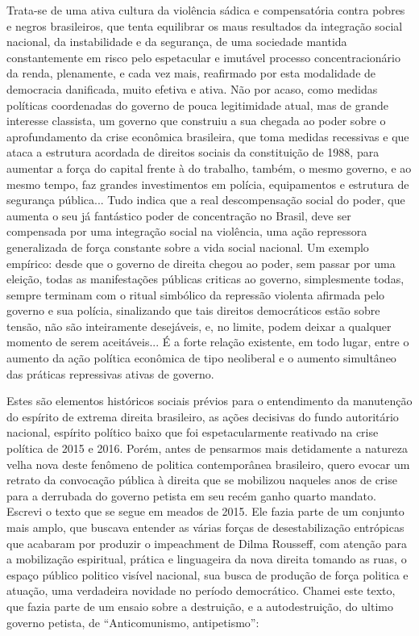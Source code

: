 Trata-se de uma ativa cultura da violência sádica e compensatória contra
pobres e negros brasileiros, que tenta equilibrar os maus resultados da
integração social nacional, da instabilidade e da segurança, de uma
sociedade mantida constantemente em risco pelo espetacular e imutável
processo concentracionário da renda, plenamente, e cada vez mais,
reafirmado por esta modalidade de democracia danificada, muito efetiva e
ativa. Não por acaso, como medidas políticas coordenadas do governo de
pouca legitimidade atual, mas de grande interesse classista, um governo
que construiu a sua chegada ao poder sobre o aprofundamento da crise
econômica brasileira, que toma medidas recessivas e que ataca a
estrutura acordada de direitos sociais da constituição de 1988, para
aumentar a força do capital frente à do trabalho, também, o mesmo
governo, e ao mesmo tempo, faz grandes investimentos em polícia,
equipamentos e estrutura de segurança pública... Tudo indica que a real
descompensação social do poder, que aumenta o seu já fantástico poder de
concentração no Brasil, deve ser compensada por uma integração social na
violência, uma ação repressora generalizada de força constante sobre a
vida social nacional. Um exemplo empírico: desde que o governo de
direita chegou ao poder, sem passar por uma eleição, todas as
manifestações públicas criticas ao governo, simplesmente todas, sempre
terminam com o ritual simbólico da repressão violenta afirmada pelo
governo e sua polícia, sinalizando que tais direitos democráticos estão
sobre tensão, não são inteiramente desejáveis, e, no limite, podem
deixar a qualquer momento de serem aceitáveis... É a forte relação
existente, em todo lugar, entre o aumento da ação política econômica de
tipo neoliberal e o aumento simultâneo das práticas repressivas ativas
de governo.

Estes são elementos históricos sociais prévios para o entendimento da
manutenção do espírito de extrema direita brasileiro, as ações decisivas
do fundo autoritário nacional, espírito político baixo que foi
espetacularmente reativado na crise política de 2015 e 2016. Porém,
antes de pensarmos mais detidamente a natureza velha nova deste fenômeno
de politica contemporânea brasileiro, quero evocar um retrato da
convocação pública à direita que se mobilizou naqueles anos de crise
para a derrubada do governo petista em seu recém ganho quarto mandato.
Escrevi o texto que se segue em meados de 2015. Ele fazia parte de um
conjunto mais amplo, que buscava entender as várias forças de
desestabilização entrópicas que acabaram por produzir o impeachment de
Dilma Rousseff, com atenção para a mobilização espiritual, prática e
linguageira da nova direita tomando as ruas, o espaço público politico
visível nacional, sua busca de produção de força politica e atuação, uma
verdadeira novidade no período democrático. Chamei este texto, que fazia
parte de um ensaio sobre a destruição, e a autodestruição, do ultimo
governo petista, de ``Anticomunismo, antipetismo'':

